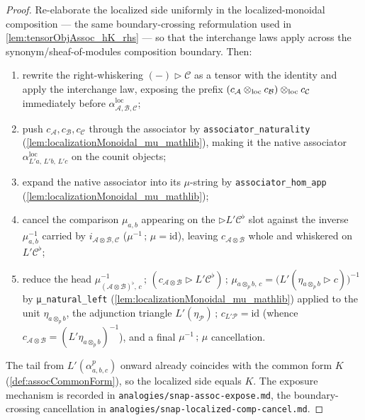\begin{proof}
  Re-elaborate the localized side uniformly in the localized-monoidal composition --- the same
  boundary-crossing reformulation used in \cref{lem:tensorObjAssoc_hK_rhs} --- so that the interchange
  laws apply across the synonym/sheaf-of-modules composition boundary. Then:
  \begin{enumerate}
    \item rewrite the right-whiskering \((-)\rhd\mathcal{C}\) as a tensor with the identity and apply the
      interchange law, exposing the prefix
      \((c_{\mathcal{A}}\mathbin{\otimes_{\mathrm{loc}}} c_{\mathcal{B}})\mathbin{\otimes_{\mathrm{loc}}} c_{\mathcal{C}}\) immediately before
      \(\alpha^{\mathrm{loc}}_{\mathcal{A},\mathcal{B},\mathcal{C}}\);
    \item push \(c_{\mathcal{A}}, c_{\mathcal{B}}, c_{\mathcal{C}}\) through the associator by
      \texttt{associator\_naturality} (\cref{lem:localizationMonoidal_mu_mathlib}), making it the native
      associator \(\alpha^{\mathrm{loc}}_{L'a,\,L'b,\,L'c}\) on the counit objects;
    \item expand the native associator into its \(\mu\)-string by \texttt{associator\_hom\_app}
      (\cref{lem:localizationMonoidal_mu_mathlib});
    \item cancel the comparison \(\mu_{a,b}\) appearing on the \(\rhd L'\mathcal{C}^{\flat}\) slot against
      the inverse \(\mu_{a,b}^{-1}\) carried by \(i_{\mathcal{A}\otimes\mathcal{B},\mathcal{C}}\)
      (\(\mu^{-1}\,;\,\mu = \mathrm{id}\)), leaving \(c_{\mathcal{A}\otimes\mathcal{B}}\) whole and
      whiskered on \(L'\mathcal{C}^{\flat}\);
    \item reduce the head
      \(\mu_{(\mathcal{A}\otimes\mathcal{B})^{\flat},\,c}^{-1}\,;\,
        (c_{\mathcal{A}\otimes\mathcal{B}} \rhd L'\mathcal{C}^{\flat})\,;\,\mu_{a\otimes_p b,\,c}
        = \bigl(L'(\eta_{a\otimes_p b} \rhd c)\bigr)^{-1}\) by \texttt{μ\_natural\_left}
      (\cref{lem:localizationMonoidal_mu_mathlib}) applied to the unit \(\eta_{a\otimes_p b}\), the
      adjunction triangle \(L'(\eta_{\mathcal{P}})\,;\,c_{L'\mathcal{P}} = \mathrm{id}\) (whence
      \(c_{\mathcal{A}\otimes\mathcal{B}} = (L'\eta_{a\otimes_p b})^{-1}\)), and a final
      \(\mu^{-1}\,;\,\mu\) cancellation.
  \end{enumerate}
  The tail from \(L'(\alpha^p_{a,b,c})\) onward already coincides with the common form \(K\)
  (\cref{def:assocCommonForm}), so the localized side equals \(K\). The exposure mechanism is recorded in
  \texttt{analogies/snap-assoc-expose.md}, the boundary-crossing cancellation in
  \texttt{analogies/snap-localized-comp-cancel.md}.

\end{proof}
